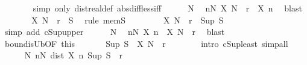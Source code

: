 \begin{isabellebody}
\ \ \ \ \ \ \isamarkupfalse%
\ {\isacharparenleft}{\kern0pt}simp\ only{\isacharcolon}{\kern0pt}\ dist{\isacharunderscore}{\kern0pt}real{\isacharunderscore}{\kern0pt}def\ abs{\isacharunderscore}{\kern0pt}diff{\isacharunderscore}{\kern0pt}less{\isacharunderscore}{\kern0pt}iff{\isacharparenright}{\kern0pt}\isanewline
\isanewline
\ \ \ \ \isamarkupfalse%
\ N\ \isamarkupfalse%
\ {\isachardoublequoteopen}{\isasymforall}n{\isasymge}N{\isachardot}{\kern0pt}\ X\ N\ {\isacharminus}{\kern0pt}\ r{\isacharslash}{\kern0pt}{}\ {\isacharless}{\kern0pt}\ X\ n{\isachardoublequoteclose}\ \isamarkupfalse%
\ blast\isanewline
\ \ \ \ \isamarkupfalse%
\ \isamarkupfalse%
\ {\isachardoublequoteopen}X\ N\ {\isacharminus}{\kern0pt}\ r{\isacharslash}{\kern0pt}{}\ {\isasymin}\ S{\isachardoublequoteclose}\ \isamarkupfalse%
\ {\isacharparenleft}{\kern0pt}rule\ mem{\isacharunderscore}{\kern0pt}S{\isacharparenright}{\kern0pt}\isanewline
\ \ \ \ \isamarkupfalse%
\ \isamarkupfalse%
\ {}{\isacharcolon}{\kern0pt}\ {\isachardoublequoteopen}X\ N\ {\isacharminus}{\kern0pt}\ r{\isacharslash}{\kern0pt}{}\ {\isasymle}\ Sup\ S{\isachardoublequoteclose}\ \isamarkupfalse%
\ {\isacharparenleft}{\kern0pt}simp\ add{\isacharcolon}{\kern0pt}\ cSup{\isacharunderscore}{\kern0pt}upper{\isacharparenright}{\kern0pt}\isanewline
\isanewline
\ \ \ \ \isamarkupfalse%
\ N\ \isamarkupfalse%
\ {\isachardoublequoteopen}{\isasymforall}n{\isasymge}N{\isachardot}{\kern0pt}\ X\ n\ {\isacharless}{\kern0pt}\ X\ N\ {\isacharplus}{\kern0pt}\ r{\isacharslash}{\kern0pt}{}{\isachardoublequoteclose}\ \isamarkupfalse%
\ blast\isanewline
\ \ \ \ \isamarkupfalse%
\ bound{\isacharunderscore}{\kern0pt}isUb{\isacharbrackleft}{\kern0pt}OF\ this{\isacharbrackright}{\kern0pt}\isanewline
\ \ \ \ \isamarkupfalse%
\ {}{\isacharcolon}{\kern0pt}\ {\isachardoublequoteopen}Sup\ S\ {\isasymle}\ X\ N\ {\isacharplus}{\kern0pt}\ r{\isacharslash}{\kern0pt}{}{\isachardoublequoteclose}\isanewline
\ \ \ \ \ \ \isamarkupfalse%
\ {\isacharparenleft}{\kern0pt}intro\ cSup{\isacharunderscore}{\kern0pt}least{\isacharparenright}{\kern0pt}\ simp{\isacharunderscore}{\kern0pt}all\isanewline
\isanewline
\ \ \ \ \isamarkupfalse%
\ {\isachardoublequoteopen}{\isasymexists}N{\isachardot}{\kern0pt}\ {\isasymforall}n{\isasymge}N{\isachardot}{\kern0pt}\ dist\ {\isacharparenleft}{\kern0pt}X\ n{\isacharparenright}{\kern0pt}\ {\isacharparenleft}{\kern0pt}Sup\ S{\isacharparenright}{\kern0pt}\ {\isacharless}{\kern0pt}\ r{\isachardoublequoteclose}\isanewline

\end{isabellebody}
